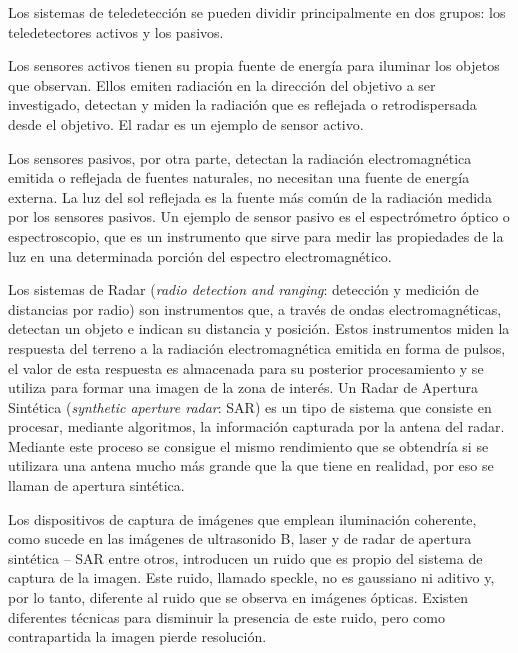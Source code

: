 Los sistemas de teledetección se pueden dividir principalmente en dos grupos: los teledetectores activos y los pasivos. 

Los sensores activos tienen su propia fuente de energía para iluminar los objetos que observan. 
Ellos emiten radiación en la dirección del objetivo a ser investigado, detectan y miden la radiación que es reflejada o retrodispersada desde el objetivo. 
El radar es un ejemplo de sensor activo.

Los sensores pasivos, por otra parte, detectan la radiación electromagnética emitida o reflejada de fuentes naturales, no necesitan una fuente de energía externa. 
La luz del sol reflejada es la fuente más común de la radiación medida por los sensores pasivos. 
Un ejemplo de sensor pasivo es el espectrómetro óptico o espectroscopio, que es un instrumento que sirve para medir las propiedades de la luz en una determinada porción del espectro electromagnético. 



Los sistemas de Radar (\textit{radio detection and ranging}: detección y medición de distancias por radio) son instrumentos que, a través de ondas electromagnéticas, detectan un objeto e indican su distancia y posición. Estos instrumentos miden la respuesta del terreno a la radiación electromagnética emitida en forma de pulsos, el valor de esta respuesta es almacenada para su posterior procesamiento y se utiliza para formar una imagen de la zona de interés. Un Radar de Apertura Sintética (\textit{synthetic aperture radar}: SAR) es un tipo de sistema que consiste en procesar, mediante algoritmos, la información capturada por la antena del radar. Mediante este proceso se consigue el mismo rendimiento que se obtendría si se utilizara una antena mucho más grande que la que tiene en realidad, por eso se llaman de apertura sintética. 

Los dispositivos de captura de imágenes que emplean iluminación coherente, como sucede en las imágenes de ultrasonido B, laser y de radar de apertura sintética – SAR entre otros, introducen un ruido que es propio del sistema de captura de la imagen. Este ruido, llamado speckle, no es gaussiano ni aditivo y, por lo tanto, diferente al ruido que se observa en imágenes ópticas. Existen diferentes técnicas para disminuir la presencia de este ruido, pero como contrapartida la imagen pierde resolución.

